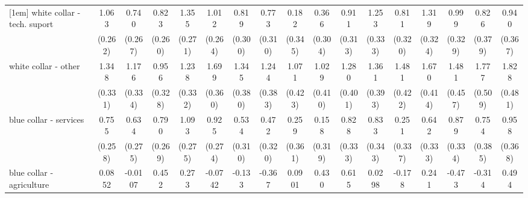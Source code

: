 {\begin{tabular}{l*{16}{c}}
[1em]
white collar - tech. suport&       1.063\sym{***}&       0.740\sym{**} &       0.823\sym{**} &       1.355\sym{***}&       1.012\sym{***}&       0.819\sym{**} &       0.773\sym{*}  &       0.182         &       0.366         &       0.911\sym{**} &       1.253\sym{***}&       0.811\sym{*}  &       1.319\sym{***}&       0.999\sym{**} &       0.826\sym{*}  &       0.940\sym{*}  \\
                    &     (0.262)         &     (0.267)         &     (0.260)         &     (0.271)         &     (0.264)         &     (0.300)         &     (0.310)         &     (0.345)         &     (0.304)         &     (0.313)         &     (0.333)         &     (0.320)         &     (0.324)         &     (0.329)         &     (0.379)         &     (0.367)         \\
[1em]
white collar - other&       1.348\sym{***}&       1.176\sym{***}&       0.956\sym{**} &       1.238\sym{***}&       1.699\sym{***}&       1.345\sym{***}&       1.244\sym{**} &       1.071\sym{*}  &       1.029\sym{*}  &       1.280\sym{**} &       1.361\sym{***}&       1.481\sym{***}&       1.670\sym{***}&       1.481\sym{**} &       1.777\sym{***}&       1.828\sym{***}\\
                    &     (0.331)         &     (0.334)         &     (0.328)         &     (0.332)         &     (0.360)         &     (0.380)         &     (0.383)         &     (0.423)         &     (0.410)         &     (0.401)         &     (0.393)         &     (0.422)         &     (0.414)         &     (0.457)         &     (0.509)         &     (0.481)         \\
[1em]
blue collar - services&       0.755\sym{**} &       0.634\sym{*}  &       0.790\sym{**} &       1.093\sym{***}&       0.925\sym{***}&       0.534         &       0.472         &       0.259         &       0.158         &       0.828\sym{*}  &       0.833\sym{*}  &       0.251         &       0.642         &       0.879\sym{**} &       0.754         &       0.958\sym{**} \\
                    &     (0.258)         &     (0.275)         &     (0.269)         &     (0.275)         &     (0.274)         &     (0.310)         &     (0.320)         &     (0.361)         &     (0.319)         &     (0.333)         &     (0.343)         &     (0.337)         &     (0.333)         &     (0.334)         &     (0.385)         &     (0.368)         \\
[1em]
blue collar - agriculture&      0.0852         &     -0.0107         &       0.452         &       0.273         &     -0.0742         &      -0.133         &      -0.367         &      0.0901         &       0.430         &       0.615         &      0.0298         &      -0.178         &       0.241         &      -0.473         &      -0.314         &       0.494         \\

\end{tabular}}

